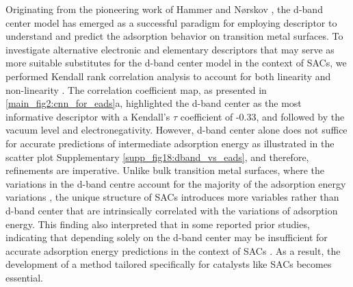 \documentclass[a4paper, 12pt, titlepage]{article}
\begin{document}
    Originating from the pioneering work of Hammer and Nørskov \cite{hammer2000theoretical},
    the d-band center model has emerged as a successful paradigm for employing descriptor to understand and predict the adsorption behavior on transition metal surfaces.
    To investigate alternative electronic and elementary descriptors that may serve as more suitable substitutes for the d-band center model in the context of SACs,
    we performed Kendall rank correlation analysis to account for both linearity and non-linearity \cite{kendall1938new}.
    The correlation coefficient map, as presented in \cref{main_fig2:cnn_for_eads}a, highlighted the d-band center as the most informative descriptor with a Kendall's $\tau$ coefficient of -0.33, and followed by the vacuum level and electronegativity.
    However, d-band center alone does not suffice for accurate predictions of intermediate adsorption energy as illustrated in the scatter plot Supplementary \cref{supp_fig18:dband_vs_eads}, and therefore, refinements are imperative.
    Unlike bulk transition metal surfaces, where the variations in the d-band centre account for the majority of the adsorption energy variations \cite{norskov2011density, takigawa2016machine}, the unique structure of SACs introduces more variables rather than d-band center that are intrinsically correlated with the variations of adsorption energy.
    This finding also interpreted that in some reported prior studies, indicating that depending solely on the d-band center may be insufficient for accurate adsorption energy predictions in the context of SACs \cite{sun2022going, fung2020descriptors, di2022universal, yuan2020descriptor, huang2020rational}.
    As a result, the development of a method tailored specifically for catalysts like SACs becomes essential.
\end{document}
